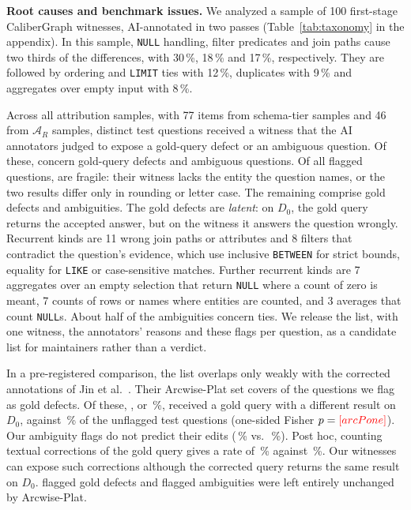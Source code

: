\textbf{Root causes and benchmark issues.} We analyzed a sample of 100 first-stage CaliberGraph witnesses, AI-annotated in two passes (Table~\ref{tab:taxonomy} in the appendix). In this sample, \texttt{NULL} handling, filter predicates and join paths cause two thirds of the differences, with 30\,\%, 18\,\% and 17\,\%, respectively. They are followed by ordering and \texttt{LIMIT} ties with 12\,\%, duplicates with 9\,\% and aggregates over empty input with 8\,\%.

Across all attribution samples, with 77 items from schema-tier samples and 46 from $\mathcal A_R$ samples,  distinct test questions received a witness that the AI annotators judged to expose a gold-query defect or an ambiguous question. Of these,  concern gold-query defects and  ambiguous questions. Of all flagged questions,  are fragile: their witness lacks the entity the question names, or the two results differ only in rounding or letter case. The remaining  comprise  gold defects and  ambiguities. The gold defects are \emph{latent}: on $D_0$, the gold query returns the accepted answer, but on the witness it answers the question wrongly. Recurrent kinds are 11 wrong join paths or attributes and 8 filters that contradict the question's evidence, which use inclusive \texttt{BETWEEN} for strict bounds, equality for \texttt{LIKE} or case-sensitive matches. Further recurrent kinds are 7 aggregates over an empty selection that return \texttt{NULL} where a count of zero is meant, 7 counts of rows or names where entities are counted, and 3 averages that count \texttt{NULL}s. About half of the ambiguities concern ties. We release the list, with one witness, the annotators' reasons and these flags per question, as a candidate list for maintainers rather than a verdict.

In a pre-registered comparison, the list overlaps only weakly with the corrected annotations of Jin et al.~\cite{jin2026annotation}. Their Arcwise-Plat set covers  of the questions we flag as gold defects. Of these, , or \,\%, received a gold query with a different result on $D_0$, against \,\% of the  unflagged test questions (one-sided Fisher $p=\V{arcPone}$). Our ambiguity flags do not predict their edits (\,\% vs.\ \,\%). Post hoc, counting textual corrections of the gold query gives a rate of \,\% against \,\%. Our witnesses can expose such corrections although the corrected query returns the same result on $D_0$.  flagged gold defects and  flagged ambiguities were left entirely unchanged by Arcwise-Plat.


